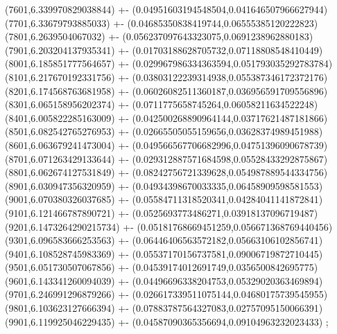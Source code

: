 {(7601,6.339970829038844) +- (0.04951603194548504,0.041646507966627944)
(7701,6.33679793885033) +- (0.04685350838419744,0.06555385120222823)
(7801,6.2639504067032) +- (0.056237097643323075,0.0691238962880183)
(7901,6.203204137935341) +- (0.01703188628705732,0.07118808548410449)
(8001,6.185851777564657) +- (0.029967986334363594,0.051793035292783784)
(8101,6.217670192331756) +- (0.03803122239314938,0.055387346172372176)
(8201,6.174568763681958) +- (0.06026082511360187,0.036956591709556896)
(8301,6.065158956202374) +- (0.0711775658745264,0.06058211634522248)
(8401,6.005822285163009) +- (0.042500268890964144,0.03717621487181866)
(8501,6.082542765276953) +- (0.02665505055159656,0.03628374989451988)
(8601,6.063679241473004) +- (0.049566567706682996,0.04751396090678739)
(8701,6.071263429133644) +- (0.029312887571684598,0.05528433292875867)
(8801,6.062674127531849) +- (0.08242756721339628,0.054987889544334756)
(8901,6.030947356320959) +- (0.04934398670033335,0.06458909598581553)
(9001,6.070380326037685) +- (0.05584711318520341,0.04284041141872841)
(9101,6.121466787890721) +- (0.0525693773486271,0.03918137096719487)
(9201,6.1473264290215734) +- (0.05181768669451259,0.056671368769440456)
(9301,6.096583666253563) +- (0.06446406563572182,0.05663106102856741)
(9401,6.108528745983369) +- (0.05537170156737581,0.09006719872710445)
(9501,6.051730507067856) +- (0.04539174012691749,0.0356500842695775)
(9601,6.143341260094039) +- (0.04496696338204753,0.05329020363469894)
(9701,6.246991296879266) +- (0.026617339511075144,0.04680175739545955)
(9801,6.103623127666394) +- (0.07883787564327083,0.02757095150066391)
(9901,6.119925046229435) +- (0.04587090365356694,0.09104963232023433)
};
